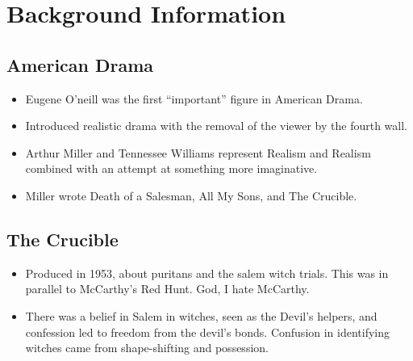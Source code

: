 \documentclass[10pt]{article}
\begin{document}
\section{Background Information}
\subsection{American Drama}
\begin{itemize}
	\item Eugene O'neill was the first ``important'' figure in American Drama.  
	\item Introduced realistic drama with the removal of the viewer by the fourth wall.
	\item Arthur Miller and Tennessee Williams represent Realism and Realism combined 
		with an attempt at something more imaginative.
	\item Miller wrote Death of a Salesman, All My Sons, and The Crucible.
\end{itemize}

\subsection{The Crucible}
\begin{itemize}
	\item Produced in 1953, about puritans and the salem witch trials.  This was in 
		parallel to McCarthy's Red Hunt.  God, I hate McCarthy.
	\item There was a belief in Salem in witches, seen as the Devil's helpers, and
		confession led to freedom from the devil's bonds.  Confusion in identifying
		witches came from shape-shifting and possession.
\end{itemize}
\end{document}
